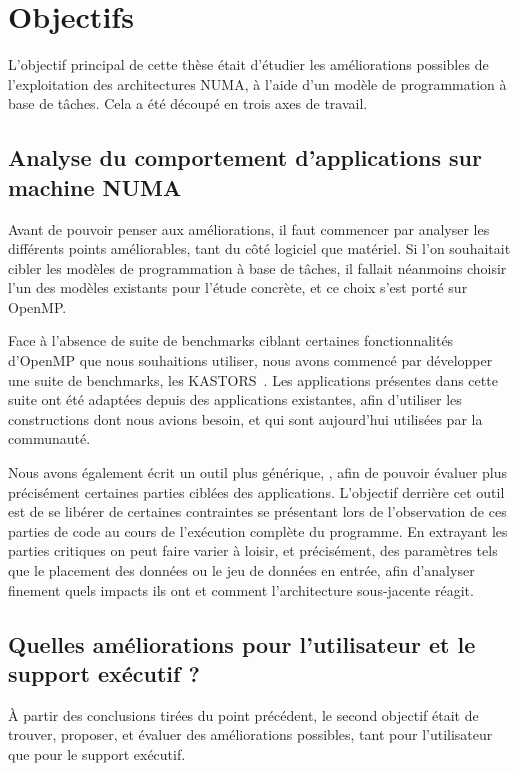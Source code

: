 \section{Objectifs}\label{sec:intro:objectives}

L'objectif principal de cette thèse était d'étudier les améliorations possibles de l'exploitation des architectures NUMA, à l'aide d'un modèle de programmation à base de tâches.
Cela a été découpé en trois axes de travail.


\subsection*{Analyse du comportement d'applications sur machine NUMA}

Avant de pouvoir penser aux améliorations, il faut commencer par analyser les différents points améliorables, tant du côté logiciel que matériel.
Si l'on souhaitait cibler les modèles de programmation à base de tâches, il fallait néanmoins choisir l'un des modèles existants pour l'étude concrète, et ce choix s'est porté sur OpenMP.

Face à l'absence de suite de benchmarks ciblant certaines fonctionnalités d'OpenMP que nous souhaitions utiliser, nous avons commencé par développer une suite de benchmarks, les KASTORS~\cite{Virouleau2014}.
Les applications présentes dans cette suite ont été adaptées depuis des applications existantes, afin d'utiliser les constructions dont nous avions besoin, et qui sont aujourd'hui utilisées par la communauté.

Nous avons également écrit un outil plus générique, \outil, afin de pouvoir évaluer plus précisément certaines parties ciblées des applications.
L'objectif derrière cet outil est de se libérer de certaines contraintes se présentant lors de l'observation de ces parties de code au cours de l'exécution complète du programme.
En extrayant les parties critiques on peut faire varier à loisir, et précisément, des paramètres tels que le placement des données ou le jeu de données en entrée, afin d'analyser finement quels impacts ils ont et comment l'architecture sous-jacente réagit.


\subsection*{Quelles améliorations pour l'utilisateur et le support exécutif ?}

À partir des conclusions tirées du point précédent, le second objectif était de trouver, proposer, et évaluer des améliorations possibles, tant pour l'utilisateur que pour le support exécutif.


